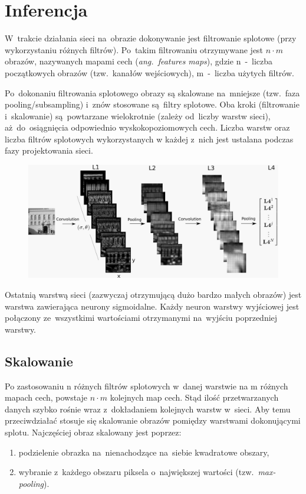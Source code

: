 \section{Inferencja} \label{sec:inferencja}
W~trakcie działania sieci na~obrazie dokonywanie jest filtrowanie splotowe (przy wykorzystaniu różnych
filtrów). Po~takim filtrowaniu otrzymywane jest $n\cdot m$ obrazów, nazywanych mapami cech
(\textit{ang.~features maps}), gdzie n~-~liczba początkowych obrazów (tzw.~kanałów wejściowych), m~-~liczba
użytych filtrów.

Po~dokonaniu filtrowania splotowego obrazy są skalowane na~mniejsze (tzw.~faza pooling/subsampling) i~znów
stosowane są~filtry splotowe. Oba kroki (filtrowanie i~skalowanie) są~powtarzane wielokrotnie
(zależy od~liczby warstw sieci), aż~do~osiągnięcia odpowiednio wyskokopoziomowych cech. Liczba warstw oraz
liczba filtrów splotowych wykorzystanych w każdej z~nich jest ustalana podczas fazy projektowania sieci.

\begin{figure}[H]
	\centering
	\includegraphics[width=\linewidth]{img/convnet.png}
\end{figure}

Ostatnią warstwą sieci (zazwyczaj otrzymującą dużo bardzo małych obrazów) jest warstwa zawierająca neurony
sigmoidalne. Każdy neuron warstwy wyjściowej jest połączony ze~wszystkimi wartościami otrzymanymi na~wyjściu
poprzedniej warstwy.

\subsection{Skalowanie}
Po zastosowaniu n różnych filtrów splotowych w~danej warstwie na m różnych mapach cech, powstaje $n\cdot m$
kolejnych map cech. Stąd ilość przetwarzanych danych szybko rośnie wraz z~dokładaniem kolejnych warstw
w~sieci. Aby temu przeciwdziałać stosuje się skalowanie obrazów pomiędzy warstwami dokonującymi splotu.
Najczęściej obraz skalowany jest poprzez:
\begin{enumerate}
  \item podzielenie obrazka na~nienachodzące na~siebie kwadratowe obszary,
  \item wybranie z~każdego obszaru piksela o~największej wartości (tzw.~\textit{max-pooling}). 
\end{enumerate}

